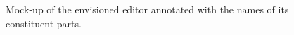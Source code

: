\begin{figure}[bt]



\caption{Mock-up of the envisioned editor annotated with the names of its constituent parts.}
\label{fig:scenario_editor_overview}
\end{figure}

